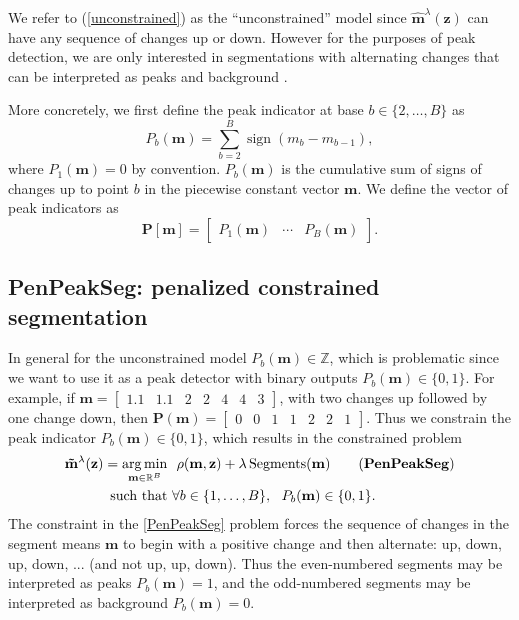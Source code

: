 \documentclass{article}
\DeclareMathOperator*{\argmin}{arg\,min}
\DeclareMathOperator*{\sign}{sign}
\DeclareMathOperator*{\Segments}{Segments}
\newcommand{\ZZ}{\mathbb Z}
\newcommand{\RR}{\mathbb R}
\begin{document}
We refer to (\ref{unconstrained}) as the ``unconstrained'' model since
$\mathbf{\hat m}^\lambda(\mathbf z)$ can have any sequence of changes
up or down. However for the purposes of peak detection, we are only
interested in segmentations with alternating changes that can be
interpreted as peaks and background \citep{PeakSeg}.

More concretely, we first define the peak indicator at base
$b\in\{2, \dots, B\}$ as
\begin{equation}
  \label{eq:peaks}
  P_b(\mathbf m) = \sum_{b=2}^B \sign( m_{b} - m_{b-1} ),
\end{equation}
where $P_1(\mathbf m)=0$ by convention. $P_b(\mathbf m)$ is the
cumulative sum of signs of changes up to point $b$ in the piecewise
constant vector $\mathbf m$. We define the vector of peak indicators
as
\begin{equation}
  \mathbf
  P[\mathbf m] = \left[
    \begin{array}{ccc}
      P_1(\mathbf m) & \cdots & P_B(\mathbf m)
    \end{array}\right].
\end{equation}

\subsection{PenPeakSeg: penalized constrained segmentation}
\label{sec:constrained}

In general for the unconstrained model $P_b(\mathbf m)\in\ZZ$, which
is problematic since we want to use it as a peak detector with binary
outputs $P_b(\mathbf m)\in \{0, 1\}$. 
For example, if $\mathbf m = \left[\begin{array}{ccccccc}1.1 &
    1.1 & 2 & 2 & 4 & 4 & 3\end{array}\right]$, with two changes up
followed by one change down, then $\mathbf P(\mathbf m) =
\left[\begin{array}{ccccccc}0 & 0 & 1 & 1 & 2 & 2 &
    1 \end{array}\right]$.
Thus we constrain the peak indicator $P_b(\mathbf m)\in\{0, 1\}$,
which results in the constrained problem
\begin{align*}
  \label{PenPeakSeg}
  \mathbf{\tilde m}^\lambda(\mathbf z)  =
  \argmin_{\mathbf m\in\RR^{B}} &\ \ 
    \rho(\mathbf m, \mathbf z) + \lambda\Segments(\mathbf m)
    \tag{\textbf{PenPeakSeg}}
  \\
  \text{such that} &\ \forall b\in\{1, \dots, B\}, \ \ P_b(\mathbf m) \in\{0, 1\}.
\end{align*}
The constraint in the \ref{PenPeakSeg} problem forces the sequence of
changes in the segment means $\mathbf m$ to begin with a positive
change and then alternate: up, down, up, down, ... (and not up, up,
down). Thus the even-numbered segments may be interpreted as peaks
$P_b(\mathbf m)=1$, and the odd-numbered segments may be interpreted
as background $P_b(\mathbf m)=0$.
\end{document}
